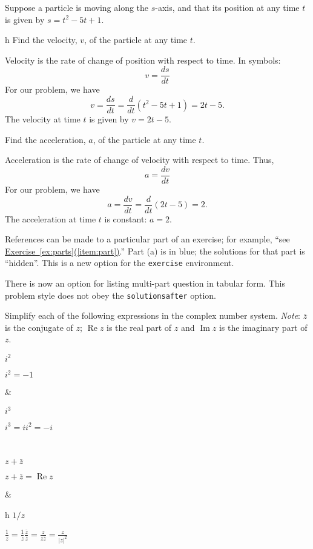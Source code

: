 \documentclass{article}
\begin{document}
\begin{exercise*}\label{ex:parts}
Suppose a particle is moving along the $s$-axis, and that its position
at any time $t$ is given by $s=t^2 - 5t + 1$.
\begin{parts}
\item[h]\label{item:part} Find the velocity, $v$, of the particle at any time
$t$.
\begin{solution}
Velocity is the rate of change of position with respect to time. In
symbols:
$$
                    v = \frac{ds}{dt}
$$
For our problem, we have
$$
        v = \frac{ds}{dt} =\frac d{dt}(t^2 - 5t + 1) = 2t-5.
$$
The velocity at time $t$ is given by $\boxed{v=2t-5}$.
\end{solution}

\item Find the acceleration, $a$, of the particle at any time $t$.
\begin{solution}
Acceleration is the rate of change of velocity with respect to time.
Thus,
$$
                    a = \frac{dv}{dt}
$$
For our problem, we have
$$
        a = \frac{dv}{dt} =\frac d{dt}(2t-5)=2.
$$
The acceleration at time $t$ is constant: $\boxed{a=2}$.
\end{solution}
\end{parts}
\end{exercise*}

References can be made to a particular part of an exercise; for example,
``see \hyperref[item:part]{Exercise~\ref*{ex:parts}(\ref*{item:part})}.''
Part (a) is in \textcolor{webblue}{blue}; the solutions for that part is
``hidden''.  This is a new option for the \texttt{exercise} environment.

There is now an option for listing multi-part question in tabular form.
This problem style does not obey the \texttt{solutions\-after} option.

\begin{exercise*}
Simplify each of the following expressions in the complex number
system. \textit{Note}: $\bar z$ is the conjugate of $z$;
$\operatorname{Re} z$ is the real part of $z$ and
$\operatorname{Im} z$ is the imaginary part of $z$.
\begin{parts}[2]
\item $i^2$
\begin{solution}[]
$i^2 = -1$
\end{solution}
&
\item $i^3$
\begin{solution}[]
$i^3 = i i^2 = -i$
\end{solution}
\\
\item $z+\bar z$
\begin{solution}[]
$z+\bar z=\operatorname{Re} z$
\end{solution}
&
\item[h] $1/z$
\begin{solution}[]
$\displaystyle\frac 1z=\frac 1z\frac{\bar z}{\bar z}=\frac z{z\bar z}=\frac z{|z|^2}$
\end{solution}
\end{parts}
\end{exercise*}
\end{document}
